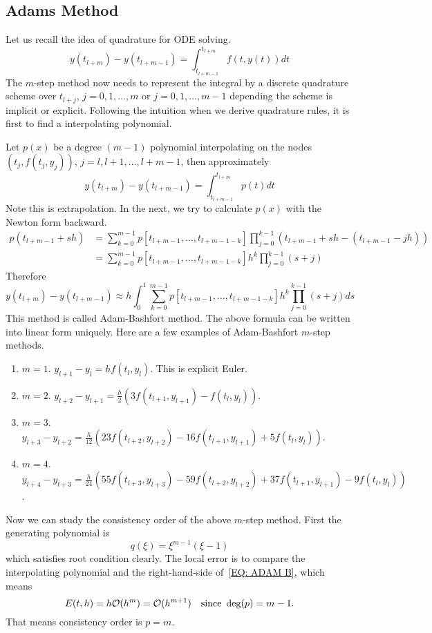 \subsection{Adams Method}
Let us recall the idea of quadrature for ODE solving.
\begin{equation}
    y(t_{l+m}) - y(t_{l+m-1}) = \int_{t_{l+m-1}}^{t_{l+m}} f(t, y(t))dt
\end{equation}
The $m$-step method now needs to represent the integral by a discrete quadrature scheme over $t_{l+j}$, $j=0, 1, \dots, m$ or $j=0,1,\dots, m-1$ depending the scheme is implicit or explicit. Following the intuition when we derive quadrature rules, it is first to find a interpolating polynomial. 

Let $p(x)$ be a degree $(m-1)$ polynomial interpolating on the nodes $(t_j, f(t_j, y_j))$, $j = l, l+1,\dots, l+m-1$, then approximately 
\begin{equation}
    y(t_{l+m}) - y(t_{l+m-1}) = \int_{t_{l+m-1}}^{t_{l+m}} p(t) dt
\end{equation}
Note this is extrapolation. In the next, we try to calculate $p(x)$ with the Newton form backward.
\begin{equation}
    \begin{aligned}
        p(t_{l+m-1} + s h) &= \sum_{k=0}^{m-1} p[t_{l+m-1},\dots, t_{{l+m-1- k}}] \prod_{j=0}^{k-1} (t_{l+m-1}+sh - (t_{l+m-1} - j h)) \\
        &=   \sum_{k=0}^{m-1} p[t_{l+m-1},\dots, t_{{l+m-1- k}}] h^k \prod_{j=0}^{k-1} (s+j) 
    \end{aligned}
\end{equation}
Therefore 
\begin{equation}\label{EQ: ADAM B}
    y(t_{l+m}) - y(t_{l+m-1}) \approx h \int_{0}^{1}  \sum_{k=0}^{m-1} p[t_{l+m-1},\dots, t_{{l+m-1- k}}] h^k \prod_{j=0}^{k-1} (s+j) ds 
\end{equation}
This method is called Adam-Bashfort method. The above formula can be written into linear form uniquely. Here are a few examples of Adam-Bashfort $m$-step methods.
\begin{enumerate}
    \item $m=1$. $y_{l+1} - y_{l} = h f(t_l, y_l)$. This is explicit Euler. 
    \item $m=2$. $y_{l+2} - y_{l+1} = \frac{h}{2}(3 f(t_{l+1}, y_{l+1}) - f(t_l, y_l))$.
    \item $m=3$. $y_{l+3} - y_{l+2} = \frac{h}{12} (23 f(t_{l+2}, y_{l+2}) - 16 f(t_{l+1}, y_{l+1}) + 5 f(t_l, y_l))$. 
    \item $m=4$.  $y_{l+4} - y_{l+3} = \frac{h}{24} (55  f(t_{l+3}, y_{l+3}) - 59 f(t_{l+2}, y_{l+2}) +37 f(t_{l+1}, y_{l+1}) -9 f(t_l, y_l))$. 
\end{enumerate}
Now we can study the consistency order of the above $m$-step method. First the generating polynomial is 
$$q(\xi) = \xi^{m-1}(\xi - 1)$$
which satisfies root condition clearly. The local error is to compare the interpolating polynomial and the right-hand-side of~\eqref{EQ: ADAM B}, which means 
\begin{equation}
    E(t, h) = h \mathcal O(h^{m}) = \mathcal O(h^{m+1})\quad \text{since } \deg(p) = m-1.
\end{equation}
That means consistency order is $p = m$. 

